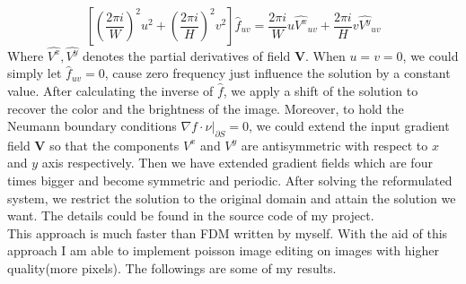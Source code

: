 \documentclass[11pt]{article}
\begin{document}
	\begin{equation}
		\left[(\frac{2\pi i}{W})^2 u^2 + (\frac{2\pi i}{H})^2 v^2\right]\hat{f}_{uv} = \frac{2 \pi i}{W} u \widehat{V^x}_{uv} + \frac{2 \pi i}{H} v \widehat{V^y}_{uv}
	\end{equation}
	Where $\widehat{V^x},\widehat{V^y}$ denotes the partial derivatives of field $\boldsymbol{V}$. When $u = v = 0$, we could simply let $\hat{f}_{uv} = 0$, cause zero frequency just influence the solution by a constant value. After calculating the inverse of $\hat{f}$, we apply a shift of the solution to recover the color and the brightness of the image. Moreover, to hold the Neumann boundary conditions $\nabla f \cdot \nu |_{\partial S} = 0$, we could extend the input gradient field $\boldsymbol{V}$ so that the components $V^x$ and $V^y$ are antisymmetric with respect to $x$ and $y$ axis respectively. Then we have extended gradient fields which are four times bigger and become symmetric and periodic. After solving the reformulated system, we restrict the solution to the original domain and attain the solution we want. The details could be found in the source code of my project.
	~\\
	This approach is much faster than FDM written by myself. With the aid of this approach I am able to implement poisson image editing on images with higher quality(more pixels). The followings are some of my results.
	
\end{document}

